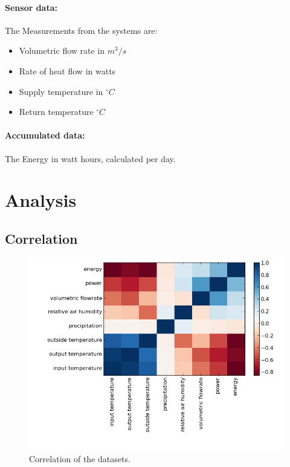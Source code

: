 \documentclass{scrartcl}
\begin{document}
\paragraph{Sensor data:}
The Measurements from the systems are:

\begin{itemize}
\item Volumetric flow rate in $m^3 / s$
\item Rate of heat flow in watts
\item Supply temperature in $^\circ C$
\item Return temperature $^\circ C$
\end{itemize}

\paragraph{Accumulated data:}
The Energy in watt hours, calculated per day.

\section{Analysis}
\label{sec:analysis}

\subsection{Correlation}
\begin{figure}[H]
  \includegraphics[width=0.6\linewidth]{img/correlation.png}
  \caption{Correlation of the datasets.}
  \label{fig:correlation}
\end{figure}
\end{document}
